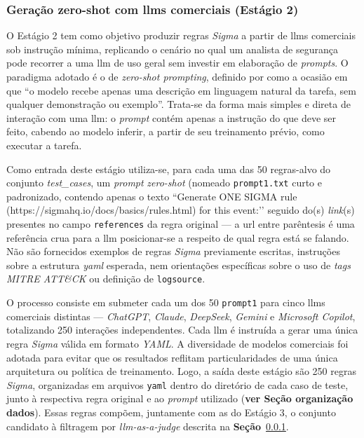\subsubsection{Geração zero-shot com \gls{llm}s comerciais (Estágio 2)}

O Estágio 2 tem como objetivo produzir regras \textit{Sigma} a partir de \gls{llm}s comerciais sob instrução mínima, replicando o cenário no qual um analista de segurança pode recorrer a uma \gls{llm} de uso geral sem investir em elaboração de \textit{prompts}. 
O paradigma adotado é o de \textit{zero-shot prompting}, definido por  como a ocasião em que ``o modelo recebe apenas uma descrição em linguagem natural da tarefa, sem qualquer demonstração ou exemplo''. 
Trata-se da forma mais simples e direta de interação com uma \gls{llm}: o \textit{prompt} contém apenas a instrução do que deve ser feito, cabendo ao modelo inferir, a partir de seu treinamento prévio, como executar a tarefa.

Como entrada deste estágio utiliza-se, para cada uma das 50 regras-alvo do conjunto \textit{test\_cases}, um \textit{prompt} \textit{zero-shot} (nomeado \texttt{prompt1.txt} curto e padronizado, contendo apenas o texto “Generate ONE SIGMA rule (https://sigmahq.io/docs/basics/rules.html) for this event:’’ seguido do(s) \textit{link}(s) presentes no campo \texttt{references} da regra original --- a \acrshort{url} entre parêntesis é uma referência crua para a \gls{llm} posicionar-se a respeito de qual regra está se falando.
Não são fornecidos exemplos de regras \textit{Sigma} previamente escritas, instruções sobre a estrutura \textit{\gls{yaml}} esperada, nem orientações específicas sobre o uso de \textit{tags MITRE ATT\&CK} ou definição de \texttt{logsource}.

O processo consiste em submeter cada um dos 50 \texttt{prompt1} para cinco \gls{llm}s comerciais distintas --- \textit{ChatGPT}, \textit{Claude}, \textit{DeepSeek}, \textit{Gemini} e \textit{Microsoft Copilot}, totalizando 250 interações independentes. 
Cada \gls{llm} é instruída a gerar uma única regra \textit{Sigma} válida em formato \textit{YAML}. 
A diversidade de modelos comerciais foi adotada para evitar que os resultados reflitam particularidades de uma única arquitetura ou política de treinamento.
Logo, a saída deste estágio são 250 regras \textit{Sigma}, organizadas em arquivos \texttt{\gls{yaml}} dentro do diretório de cada caso de teste, junto à respectiva regra original e ao \textit{prompt} utilizado (\textbf{ver Seção organização dados}). 
Essas regras compõem, juntamente com as do Estágio 3, o conjunto candidato à filtragem por \textit{\gls{llm}-as-a-judge} descrita na \textbf{Seção}~\ref{}.

